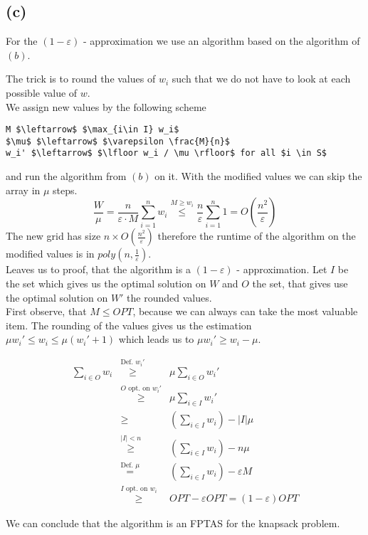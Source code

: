 \subsection*{(c)}

For the $(1 - \varepsilon)$ - approximation we use an algorithm based on the algorithm of $(b)$.

The trick is to round the values of $w_i$ such that we do not have to look at each possible value of $w$.\\

We assign new values by the following scheme

\begin{lstlisting}
M $\leftarrow$ $\max_{i\in I} w_i$
$\mu$ $\leftarrow$ $\varepsilon \frac{M}{n}$
w_i' $\leftarrow$ $\lfloor w_i / \mu \rfloor$ for all $i \in S$
\end{lstlisting}

and run the algorithm from $(b)$ on it.
With the modified values we can skip the array in $\mu$ steps.
$$
\frac{W}{\mu} = \frac{n}{\varepsilon \cdot M} \overset{n}{\underset{i=1}{\sum}} w_i \stackrel{M \geq w_i}{\leq} \frac{n}{\varepsilon} \overset{n}{\underset{i=1}{\sum}} 1 = O (\frac{n^2}{\varepsilon})
$$
The new grid has size $n \times O (\frac{n^2}{\varepsilon})$ therefore the runtime of the algorithm on the modified values is
in $poly(n, \frac{1}{\varepsilon})$.\\
Leaves us to proof, that the algorithm is a $(1-\varepsilon)$ - approximation.
Let $I$ be the set which gives us the optimal solution on $W$ and $O$ the set, that gives use the optimal solution on $W'$ the rounded values.\\

First observe, that $M \leq OPT$, because we can always can take the most valuable item. The rounding of the values gives us the estimation 
$ \mu w_i' \leq w_i \leq \mu (w_i' + 1)$ which leads us to $\mu w_i'  \geq w_i - \mu$.

$$\begin{array}{rcl}
    \underset{i \in O}{\sum} w_i &\stackrel{\text{Def. } w_i'}{\geq}& \mu \underset{i \in O}{\sum} w_i'\\
        &\stackrel{O \text{ opt. on } w_i'}{\geq}& \mu \underset{i \in I}{\sum} w_i'\\
        &\geq& (\underset{i \in I}{\sum} w_i) - |I|\mu\\
        &\stackrel{|I| < n}{\geq}& (\underset{i \in I}{\sum} w_i) - n \mu\\
        &\stackrel{\text{Def. }\mu}{=}& (\underset{i \in I}{\sum} w_i) - \varepsilon M\\
        &\stackrel{I \text{ opt. on }w_i}{\geq}& OPT - \varepsilon OPT = (1-\varepsilon) OPT
\end{array}$$ 

We can conclude that the algorithm is an FPTAS for the knapsack problem.
